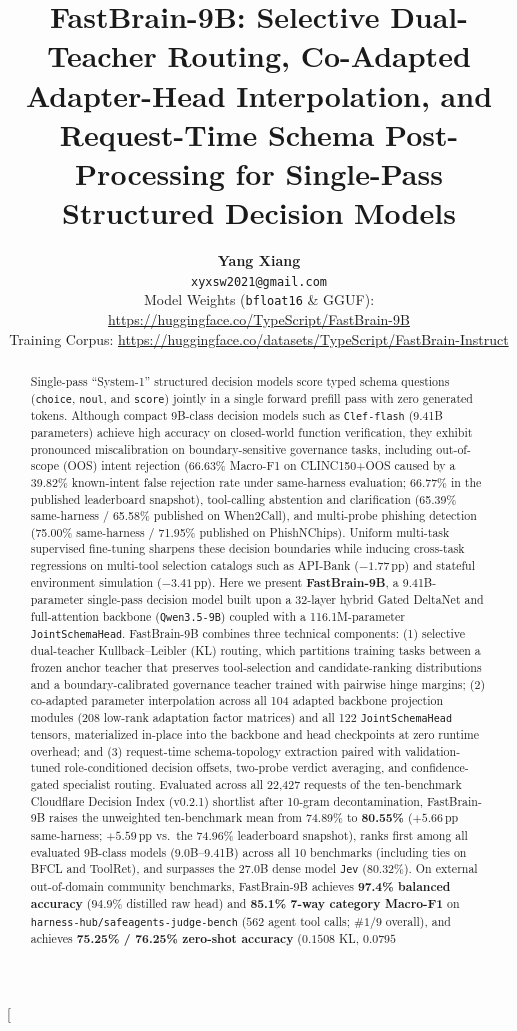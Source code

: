 \documentclass[10pt,twocolumn]{article}
\title{\Large \textbf{FastBrain-9B: Selective Dual-Teacher Routing, Co-Adapted Adapter-Head Interpolation, and Request-Time Schema Post-Processing for Single-Pass Structured Decision Models}}
\author{
  \textbf{Yang Xiang} \\
  \texttt{xyxsw2021@gmail.com} \\
  {\small Model Weights (\texttt{bfloat16} \& GGUF): \url{https://huggingface.co/TypeScript/FastBrain-9B}} \\
  {\small Training Corpus: \url{https://huggingface.co/datasets/TypeScript/FastBrain-Instruct}}
}
\date{}
\begin{document}
\twocolumn[
\begin{@twocolumnfalse}
\maketitle
\vspace{-0.48cm}
\begin{abstract}
\noindent Single-pass ``System-1'' structured decision models score typed schema questions (\texttt{choice}, \texttt{noul}, and \texttt{score}) jointly in a single forward prefill pass with zero generated tokens. Although compact 9B-class decision models such as \texttt{Clef-flash} (9.41B parameters) achieve high accuracy on closed-world function verification, they exhibit pronounced miscalibration on boundary-sensitive governance tasks, including out-of-scope (OOS) intent rejection (66.63\% Macro-F1 on CLINC150+OOS caused by a 39.82\% known-intent false rejection rate under same-harness evaluation; 66.77\% in the published leaderboard snapshot), tool-calling abstention and clarification (65.39\% same-harness / 65.58\% published on When2Call), and multi-probe phishing detection (75.00\% same-harness / 71.95\% published on PhishNChips). Uniform multi-task supervised fine-tuning sharpens these decision boundaries while inducing cross-task regressions on multi-tool selection catalogs such as API-Bank ($-1.77$\,pp) and stateful environment simulation ($-3.41$\,pp). Here we present \textbf{FastBrain-9B}, a 9.41B-parameter single-pass decision model built upon a 32-layer hybrid Gated DeltaNet and full-attention backbone (\texttt{Qwen3.5-9B}) coupled with a 116.1M-parameter \texttt{JointSchemaHead}. FastBrain-9B combines three technical components: (1) selective dual-teacher Kullback--Leibler (KL) routing, which partitions training tasks between a frozen anchor teacher that preserves tool-selection and candidate-ranking distributions and a boundary-calibrated governance teacher trained with pairwise hinge margins; (2) co-adapted parameter interpolation across all 104 adapted backbone projection modules (208 low-rank adaptation factor matrices) and all 122 \texttt{JointSchemaHead} tensors, materialized in-place into the backbone and head checkpoints at zero runtime overhead; and (3) request-time schema-topology extraction paired with validation-tuned role-conditioned decision offsets, two-probe verdict averaging, and confidence-gated specialist routing. Evaluated across all 22,427 requests of the ten-benchmark Cloudflare Decision Index (v0.2.1) shortlist after 10-gram decontamination, FastBrain-9B raises the unweighted ten-benchmark mean from 74.89\% to \textbf{80.55\%} ($+5.66$\,pp same-harness; $+5.59$\,pp vs.\ the 74.96\% leaderboard snapshot), ranks first among all evaluated 9B-class models (9.0B--9.41B) across all 10 benchmarks (including ties on BFCL and ToolRet), and surpasses the 27.0B dense model \texttt{Jev} (80.32\%). On external out-of-domain community benchmarks, FastBrain-9B achieves \textbf{97.4\% balanced accuracy} ($94.9\%$ distilled raw head) and \textbf{85.1\% 7-way category Macro-F1} on \texttt{harness-hub/safeagents-judge-bench} ($562$ agent tool calls; $\#1/9$ overall), and achieves \textbf{75.25\% / 76.25\% zero-shot accuracy} ($0.1508$ KL, $0.0795$ 
\end{abstract}
\end{@twocolumnfalse}
\end{document}

